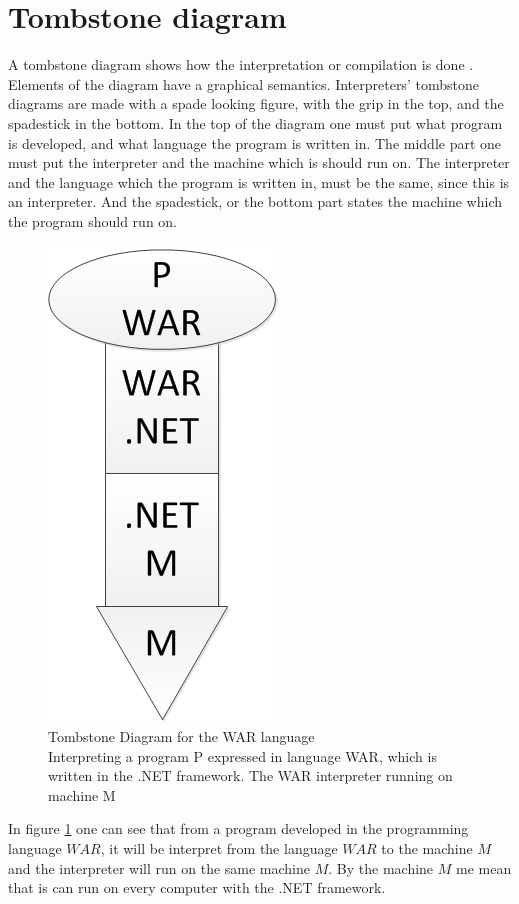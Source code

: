 \section{Tombstone diagram}

A tombstone diagram shows how the interpretation or compilation is done \cite{Tombstone}.
Elements of the diagram have a graphical semantics. 
Interpreters' tombstone diagrams are made with a spade looking figure, with the grip in the top, and the spadestick in the bottom. In the top of the diagram one must put what program is developed, and what language the program is written in. The middle part one must put the interpreter and the machine which is should run on. The interpreter and the language which the program is written in, must be the same, since this is an interpreter. And the spadestick, or the bottom part states the machine which the program should run on.

			\begin{figure}
				\centering
				\includegraphics[scale=0.75]{rapport/3/figures/tombstone}
				\caption{Tombstone Diagram for the WAR language\\ Interpreting a program P expressed in language WAR, which is written in the .NET framework. The WAR interpreter running on machine M} \label{fig:tombstone}
			\end{figure}
			
In figure \ref{fig:tombstone} one can see that from a program developed in the programming language $WAR$, it will be interpret from the language $WAR$ to the machine $M$ and the interpreter will run on the same machine $M$. By the machine $M$ me mean that is can run on every computer with the .NET framework.

